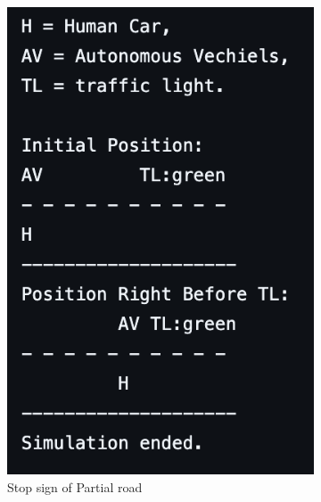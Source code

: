 \documentclass[conference]{IEEEtran}
\begin{document}
\begin{figure}[h]
\begin{subfigure}[b]{0.3\textwidth}
        \includegraphics[width=\linewidth]{Fig/Commonsense_S2.png}
        \caption{Stop sign of Partial road}
    \end{subfigure}
    \hfill
    \begin{subfigure}[b]{0.3\textwidth}

\end{subfigure}
\end{figure}
\end{document}
